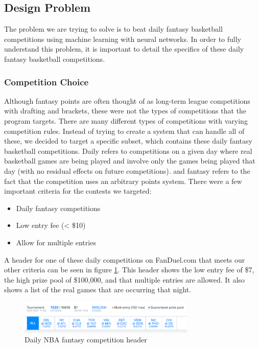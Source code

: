 \subsection{Design Problem}
The problem we are trying to solve is to beat daily fantasy basketball competitions using machine learning with neural networks. In order to fully understand this problem, it is important to detail the specifics of these daily fantasy basketball competitions. 
\subsubsection{Competition Choice}
Although fantasy points are often thought of as long-term league competitions with drafting and brackets, these were not the types of competitions that the program targets. There are many different types of competitions with varying competition rules. Instead of trying to create a system that can handle all of these, we decided to target a specific subset, which contains these daily fantasy basketball competitions. Daily refers to competitions on a given day where real basketball games are being played and involve only the games being played that day (with no residual effects on future competitions). and fantasy refers to the fact that the competition uses an arbitrary points system. There were a few important criteria for the contests we targeted:
\begin{itemize}
\item Daily fantasy competitions
\item Low entry fee (< \$10)
\item Allow for multiple entries
\end{itemize}

A header for one of these daily competitions on FanDuel.com that meets our other criteria can be seen in figure \ref{fig:comp_header}. This header shows the low entry fee of \$7, the high prize pool of \$100,000, and that multiple entries are allowed. It also shows a list of the real games that are occurring that night.

\begin{figure}[ht]
    \centering
    \includegraphics[width=0.75\textwidth]{figures/fantasy_competition_header}
    \caption{Daily NBA fantasy competition header}
    \label{fig:comp_header}
\end{figure}

